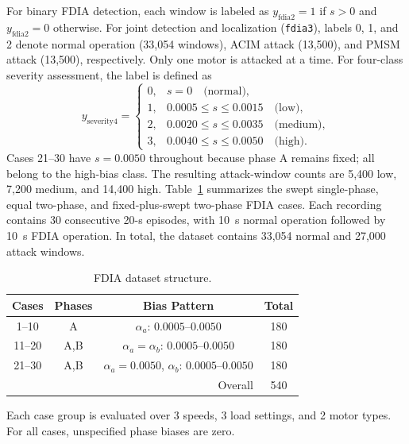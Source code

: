 \documentclass[letterpaper,journal]{IEEEtran}
\begin{document}
For binary FDIA detection, each window is labeled as
$y_{\mathrm{fdia2}}=1$ if $s>0$ and $y_{\mathrm{fdia2}}=0$ otherwise.
For joint detection and localization (\texttt{fdia3}), labels 0, 1, and 2 denote normal operation (33,054 windows), ACIM attack (13,500), and PMSM attack (13,500), respectively. Only one motor is attacked at a time.
For four-class severity assessment, the label is defined as
\begin{equation}
y_{\mathrm{severity4}} =
\begin{cases}
0, & s=0 \quad \text{(normal)},\\
1, & 0.0005 \leq s \leq 0.0015 \quad \text{(low)},\\
2, & 0.0020 \leq s \leq 0.0035 \quad \text{(medium)},\\
3, & 0.0040 \leq s \leq 0.0050 \quad \text{(high)}.
\end{cases}
\label{eq:severity_bins}
\end{equation}
Cases 21--30 have $s=0.0050$ throughout because phase A remains fixed; all belong to the high-bias class. The resulting attack-window counts are 5,400 low, 7,200 medium, and 14,400 high.
Table~\ref{tab:cyberattack_dataset_structure} summarizes the swept single-phase, equal two-phase, and fixed-plus-swept two-phase FDIA cases. Each recording contains 30 consecutive 20-s episodes, with 10~s normal operation followed by 10~s FDIA operation. In total, the dataset contains 33,054 normal and 27,000 attack windows.

\begin{table}[t]
\centering
\footnotesize
\caption{FDIA dataset structure.}
\label{tab:cyberattack_dataset_structure}
\renewcommand{\arraystretch}{1.12}
\begin{tabular}{c c c c}
\hline
Cases & Phases & Bias Pattern & Total \\
\hline
1--10  & A   & $\alpha_a$: $0.0005$--$0.0050$ & 180 \\
11--20 & A,B & $\alpha_a=\alpha_b$: $0.0005$--$0.0050$ & 180 \\
21--30 & A,B & $\alpha_a=0.0050$, $\alpha_b$: $0.0005$--$0.0050$ & 180 \\
\hline
\multicolumn{3}{r}{Overall} & 540 \\
\hline
\end{tabular}
\vspace{1mm}
\begin{flushleft}
\footnotesize Each case group is evaluated over 3 speeds, 3 load settings, and 2 motor types. For all cases, unspecified phase biases are zero.
\end{flushleft}
\end{table}
\end{document}
